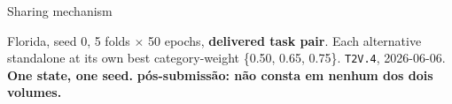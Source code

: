 \documentclass{beamer}
\begin{document}
\begin{frame}[noframenumbering]{Sharing mechanism}
    \vfill
    {\scriptsize
    \begin{minipage}[b]{0.80\linewidth}\raggedright\textcolor{black!70}{Florida, seed 0, 5 folds
    $\times$ 50 epochs, \textbf{delivered task pair}. Each alternative standalone at its own best
    category-weight \{0.50, 0.65, 0.75\}. \texttt{T2V.4}, 2026-06-06.
    \textbf{One state, one seed.} \textbf{pós-submissão: não consta em nenhum dos dois volumes.}}\end{minipage}\hfill
    \begin{minipage}[b]{0.15\linewidth}\raggedleft \hyperlink{b0}{}\end{minipage}}
\end{frame}
\end{document}
